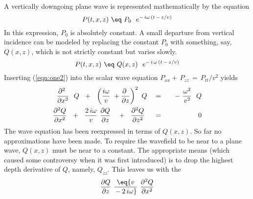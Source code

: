 \par
A vertically downgoing plane wave is represented mathematically
by the equation
\begin{equation}
P(t,x,z) \  \eq \  P_0 \ \  e^{{-} \,i \omega \,(t \,-\, z/v) }
\label{eqn:one1}
\end{equation}
In this expression,  $P_0$  is absolutely constant.
A small departure from vertical incidence can be modeled
by replacing the constant  $P_0$  with something,
say,  $Q(x,z)$,  which is not strictly constant but varies slowly.
\begin{equation}
P(t,x,z) \  \eq \  Q(x,z) \ \  e^{{-} \, i \, \omega \, (t \, - \, z/v) }
\label{eqn:one2}
\end{equation}
Inserting (\ref{eqn:one2}) into the scalar wave
equation  $ P_{xx} +\,P_{zz} \,=\, P_{tt} / v^2$  yields
\begin{eqnarray}
{\partial^2 \   \over \partial x^2} \ \  Q \ \ +\ \ 
\left( {i \omega  \over v }\  + {\partial \   \over \partial z} \right)^2 \ Q
\ \ \ &=&\ \ \  - \  { \omega^2   \over v^2} \ \ Q
\nonumber
\\
{\partial^2 Q  \over \partial x^2}  \ \ +\ \ 
{2\, i \omega  \over v }\  {\partial Q  \over \partial z} \ \ \ +\ \ 
{\partial^2 Q  \over \partial z^2} \ \ \ \ &=&\ \ \ 0
\label{eqn:one3}
\end{eqnarray}
The wave equation has been reexpressed in terms of  $Q(x,z)$.
So far no approximations have been made.
To require the wavefield to be
near to a plane wave,  $Q(x,z)$  must be near to a constant.
The appropriate means
(which caused some controversy when it was first introduced)
is to drop the highest depth derivative of  $Q$,
namely,  $Q_{zz}$.
This leaves us with the
{\em 
{}
}
\begin{equation}
{\partial Q  \over \partial z} \  \eq 
{v \over \,-\,2\, i \omega} \   {\partial^2 Q  \over \partial x^2} 
\label{eqn:one4}
\end{equation}

%

